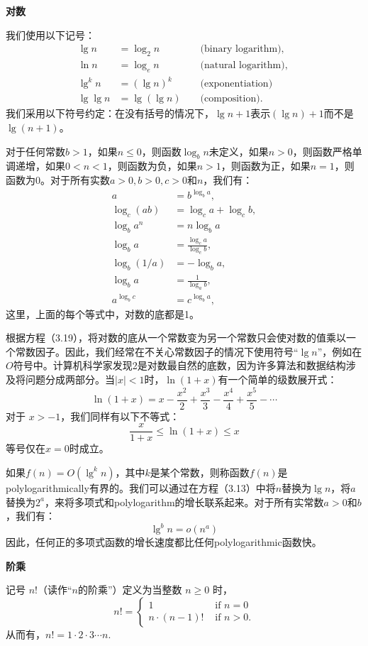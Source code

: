 \documentclass[lang=cn,newtx,10pt,scheme=chinese]{elegantbook}
\begin{document}
\textbf{对数}

我们使用以下记号：
$$
\begin{aligned}
\lg n & =\log _2 n & & \text { (binary logarithm), } \\
\ln n & =\log _e n & & \text { (natural logarithm), } \\
\lg ^k n & =(\lg n)^k & & \text { (exponentiation) } \\
\lg \lg n & =\lg (\lg n) & & \text { (composition). }
\end{aligned}
$$
我们采用以下符号约定：在没有括号的情况下，$\lg n+1$表示$(\lg n)+1$而不是$\lg (n+1)$。

对于任何常数$b>1$，如果$n \leq 0$，则函数$\log _b n$未定义，如果$n>0$，则函数严格单调递增，如果$0<n<1$，则函数为负，如果$n>1$，则函数为正，如果$n=1$，则函数为0。对于所有实数$a>0, b>0, c>0$和$n$，我们有：
$$
\begin{aligned}
a & =b^{\log _b a}, \\
\log _c(a b) & =\log _c a+\log _c b, \\
\log _b a^n & =n \log _b a \\
\log _b a & =\frac{\log _c a}{\log _c b}, \\
\log _b(1 / a) & =-\log _b a, \\
\log _b a & =\frac{1}{\log _a b}, \\
a^{\log _b c} & =c^{\log _b a},
\end{aligned}
$$
这里，上面的每个等式中，对数的底都是1。

根据方程（3.19），将对数的底从一个常数变为另一个常数只会使对数的值乘以一个常数因子。因此，我们经常在不关心常数因子的情况下使用符号“$\lg n$”，例如在$O$符号中。计算机科学家发现2是对数最自然的底数，因为许多算法和数据结构涉及将问题分成两部分。当$|x|<1$时，$\ln (1+x)$有一个简单的级数展开式：
$$
\ln (1+x)=x-\frac{x^2}{2}+\frac{x^3}{3}-\frac{x^4}{4}+\frac{x^5}{5}-\cdots
$$
对于 $x>-1$，我们同样有以下不等式：
$$
\frac{x}{1+x} \leq \ln (1+x) \leq x
$$
等号仅在$x=0$时成立。

如果$f(n)=O\left(\lg ^k n\right)$，其中$k$是某个常数，则称函数$f(n)$是polylogarithmically有界的。我们可以通过在方程（3.13）中将$n$替换为$\lg n$，将$a$替换为$2^a$，来将多项式和polylogarithm的增长联系起来。对于所有实常数$a>0$和$b$，我们有：
$$
\lg ^b n=o\left(n^a\right)
$$
因此，任何正的多项式函数的增长速度都比任何polylogarithmic函数快。

\textbf{阶乘}

记号 $n!$（读作``$n$的阶乘''）定义为当整数 $n \geq 0$ 时，
$$
n != \begin{cases}1 & \text { if } n=0 \\ n \cdot(n-1) ! & \text { if } n>0 .\end{cases}
$$
从而有，$n !=1 \cdot 2 \cdot 3 \cdots n$.
\end{document}
